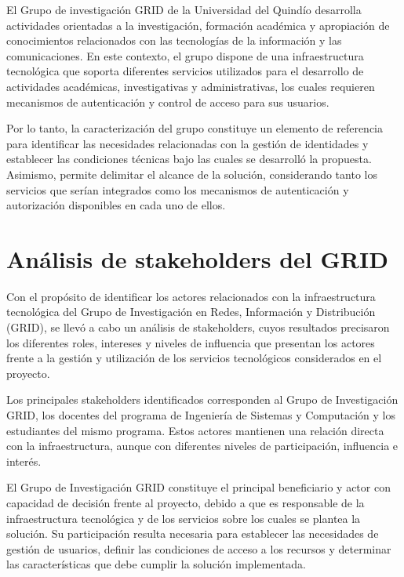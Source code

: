 \label{cap:caracterizacion-grid}
\vspace*{0.7cm}

El Grupo de investigación \ac{GRID} de la Universidad del Quindío desarrolla actividades orientadas a la investigación, formación académica y apropiación de conocimientos relacionados con las tecnologías de la información y las comunicaciones. En este contexto, el grupo dispone de una infraestructura tecnológica que soporta diferentes servicios utilizados para el desarrollo de actividades académicas, investigativas y administrativas, los cuales requieren mecanismos de autenticación y control de acceso para sus usuarios.

Por lo tanto, la caracterización del grupo constituye un elemento de referencia para identificar las necesidades relacionadas con la gestión de identidades y establecer las condiciones técnicas bajo las cuales se desarrolló la propuesta. Asimismo, permite delimitar el alcance de la solución, considerando tanto los servicios que serían integrados como los mecanismos de autenticación y autorización disponibles en cada uno de ellos.

\section{Análisis de stakeholders del \texorpdfstring{\ac{GRID}}{GRID}}

Con el propósito de identificar los actores relacionados con la infraestructura tecnológica del Grupo de Investigación en Redes, Información y Distribución (\ac{GRID}), se llevó a cabo un análisis de stakeholders, cuyos resultados precisaron los diferentes roles, intereses y niveles de influencia que presentan los actores frente a la gestión y utilización de los servicios tecnológicos considerados en el proyecto.

Los principales stakeholders identificados corresponden al Grupo de Investigación \ac{GRID}, los docentes del programa de Ingeniería de Sistemas y Computación y los estudiantes del mismo programa. Estos actores mantienen una relación directa con la infraestructura, aunque con diferentes niveles de participación, influencia e interés.

El Grupo de Investigación \ac{GRID} constituye el principal beneficiario y actor con capacidad de decisión frente al proyecto, debido a que es responsable de la infraestructura tecnológica y de los servicios sobre los cuales se plantea la solución. Su participación resulta necesaria para establecer las necesidades de gestión de usuarios, definir las condiciones de acceso a los recursos y determinar las características que debe cumplir la solución implementada.

